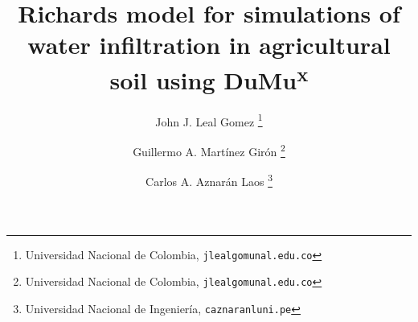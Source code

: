 \documentclass{beamer}
\title{Richards model for simulations of water infiltration in agricultural soil using DuMu\textsuperscript{x}}
\author{John J. Leal Gomez
	\thanks{
		Universidad Nacional de Colombia,
		\texttt{jlealgom\MVAt unal.edu.co}}
    \and Guillermo A. Martínez Girón
    \thanks{
    Universidad Nacional de Colombia,
		\texttt{jlealgom\MVAt unal.edu.co}}
    \and Carlos A. Aznarán Laos
    \thanks{
      Universidad Nacional de Ingeniería,
		\texttt{caznaranl\MVAt uni.pe}}
}
\begin{document}
% 

\begin{frame}
	\maketitle
\end{frame}

\section{}

\begin{frame}
\frametitle{\secname}
\end{frame}

\begin{frame}

\end{frame}


\begin{frame}

\end{frame}
\end{document}
